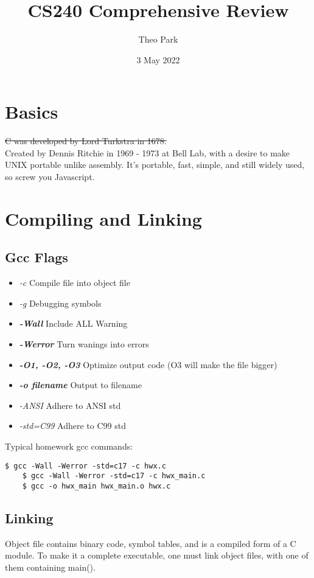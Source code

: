 \documentclass{article}
\title{CS240 Comprehensive Review}
\author{Theo Park}
\date{3 May 2022}
\begin{document}
\maketitle

\section{Basics}
\st{C was developed by Lord Turkstra in 1678.}\\
Created by Dennis Ritchie in 1969 - 1973 at Bell Lab, with a desire to make UNIX portable unlike assembly.
It's portable, fast, simple, and still widely used, so screw you Javascript.


\section{Compiling and Linking}

\subsection{Gcc Flags}
\begin{itemize}
    \item \textit{-c} Compile file into object file
    \item \textit{-g} Debugging symbols
    \item \textbf{\textit{-Wall}} Include ALL Warning
    \item \textbf{\textit{-Werror}} Turn wanings into errors
    \item \textbf{\textit{-O1, -O2, -O3}} Optimize output code (O3 will make the file bigger)
    \item \textbf{\textit{-o filename}} Output to filename
    \item \textit{-ANSI} Adhere to ANSI std
    \item \textit{-std=C99} Adhere to C99 std
\end{itemize}
Typical homework gcc commands:
\begin{lstlisting}[style=BashStyle]
    $ gcc -Wall -Werror -std=c17 -c hwx.c
    $ gcc -Wall -Werror -std=c17 -c hwx_main.c
    $ gcc -o hwx_main hwx_main.o hwx.c
\end{lstlisting}

\subsection{Linking}
Object file contains binary code, symbol tables, and is a compiled form of a C module.
To make it a complete executable, one must link object files, with one of them containing main().
\end{document}
